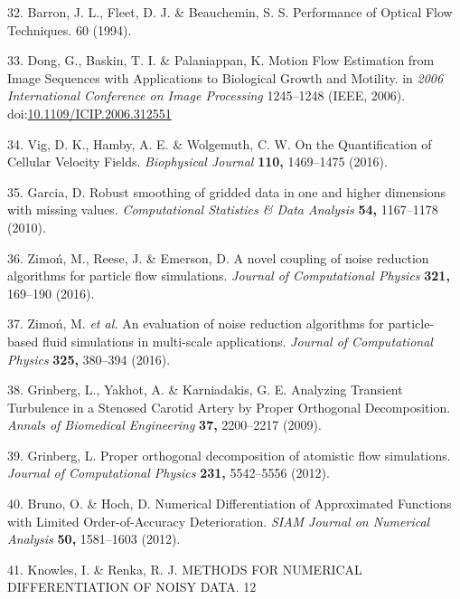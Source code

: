\documentclass{Dissertate}
\begin{document}
\leavevmode\hypertarget{ref-barron_performance_1994}{}%
32. Barron, J. L., Fleet, D. J. \& Beauchemin, S. S. Performance of
Optical Flow Techniques. 60 (1994).

\leavevmode\hypertarget{ref-dong_motion_2006}{}%
33. Dong, G., Baskin, T. I. \& Palaniappan, K. Motion Flow Estimation
from Image Sequences with Applications to Biological Growth and
Motility. in \emph{2006 International Conference on Image Processing}
1245--1248 (IEEE, 2006).
doi:\href{https://doi.org/10.1109/ICIP.2006.312551}{10.1109/ICIP.2006.312551}

\leavevmode\hypertarget{ref-vig_quantification_2016}{}%
34. Vig, D. K., Hamby, A. E. \& Wolgemuth, C. W. On the Quantification
of Cellular Velocity Fields. \emph{Biophysical Journal} \textbf{110,}
1469--1475 (2016).

\leavevmode\hypertarget{ref-garcia_robust_2010}{}%
35. Garcia, D. Robust smoothing of gridded data in one and higher
dimensions with missing values. \emph{Computational Statistics \& Data
Analysis} \textbf{54,} 1167--1178 (2010).

\leavevmode\hypertarget{ref-zimon_novel_2016}{}%
36. Zimoń, M., Reese, J. \& Emerson, D. A novel coupling of noise
reduction algorithms for particle flow simulations. \emph{Journal of
Computational Physics} \textbf{321,} 169--190 (2016).

\leavevmode\hypertarget{ref-zimon_evaluation_2016}{}%
37. Zimoń, M. \emph{et al.} An evaluation of noise reduction algorithms
for particle-based fluid simulations in multi-scale applications.
\emph{Journal of Computational Physics} \textbf{325,} 380--394 (2016).

\leavevmode\hypertarget{ref-grinberg_analyzing_2009}{}%
38. Grinberg, L., Yakhot, A. \& Karniadakis, G. E. Analyzing Transient
Turbulence in a Stenosed Carotid Artery by Proper Orthogonal
Decomposition. \emph{Annals of Biomedical Engineering} \textbf{37,}
2200--2217 (2009).

\leavevmode\hypertarget{ref-grinberg_proper_2012}{}%
39. Grinberg, L. Proper orthogonal decomposition of atomistic flow
simulations. \emph{Journal of Computational Physics} \textbf{231,}
5542--5556 (2012).

\leavevmode\hypertarget{ref-bruno_numerical_2012}{}%
40. Bruno, O. \& Hoch, D. Numerical Differentiation of Approximated
Functions with Limited Order-of-Accuracy Deterioration. \emph{SIAM
Journal on Numerical Analysis} \textbf{50,} 1581--1603 (2012).

\leavevmode\hypertarget{ref-knowles_methods_nodate}{}%
41. Knowles, I. \& Renka, R. J. METHODS FOR NUMERICAL DIFFERENTIATION OF
NOISY DATA. 12
\end{document}
